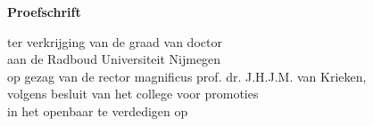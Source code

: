 \begin{titlepage}

    \begin{center}

        \vspace*{2\bigskipamount}

        {\makeatletter
            \titlestyle\bfseries\LARGE\@title
            \makeatother}

        {\makeatletter
            \ifx\@subtitle\undefined\else
                \bigskip
                \titlefont\titleshape\Large\@subtitle
            \fi
            \makeatother}

    \end{center}

    \cleardoublepage
    \thispagestyle{empty}

    \begin{center}


        \vspace*{2\bigskipamount}

        {\makeatletter
            \titlestyle\bfseries\LARGE\@title
            \makeatother}

        {\makeatletter
            \ifx\@subtitle\undefined\else
                \bigskip
                \titlefont\titleshape\Large\@subtitle
            \fi
            \makeatother}

        \vfill


        {\Large\titlefont\bfseries Proefschrift}

        \bigskip
        \bigskip

        ter verkrijging van de graad van doctor\\
        aan de Radboud Universiteit Nijmegen\\
        op gezag van de rector magnificus prof. dr. J.H.J.M. van Krieken,\\
        volgens besluit van het college voor promoties\\
        in het openbaar te verdedigen op\\


\end{center}
\end{titlepage}
